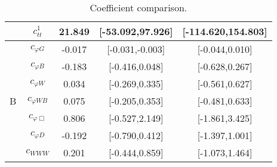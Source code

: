 \documentclass{article}
\begin{document}
\begin{table}[H]
\begin{tabular}{|c|c|c|c|c|}
 & $c_{tt}^{1}$ & 21.849 & [-53.092,97.926] & [-114.620,154.803]  \\ \cline{2-5}
\hline
\multirow{7}{*}{B}
 & $c_{\varphi G}$ & -0.017 & [-0.031,-0.003] & [-0.044,0.010]  \\ \cline{2-5}
 & $c_{\varphi B}$ & -0.183 & [-0.416,0.048] & [-0.628,0.267]  \\ \cline{2-5}
 & $c_{\varphi W}$ & 0.034 & [-0.269,0.335] & [-0.561,0.627]  \\ \cline{2-5}
 & $c_{\varphi WB}$ & 0.075 & [-0.205,0.353] & [-0.481,0.633]  \\ \cline{2-5}
 & $c_{\varphi \Box}$ & 0.806 & [-0.527,2.149] & [-1.861,3.425]  \\ \cline{2-5}
 & $c_{\varphi D}$ & -0.192 & [-0.790,0.412] & [-1.397,1.001]  \\ \cline{2-5}
 & $c_{WWW}$ & 0.201 & [-0.444,0.859] & [-1.073,1.464]  \\ \cline{2-5}
\hline
\end{tabular}
\caption{Coefficient comparison.}
\end{table}
\end{document}
